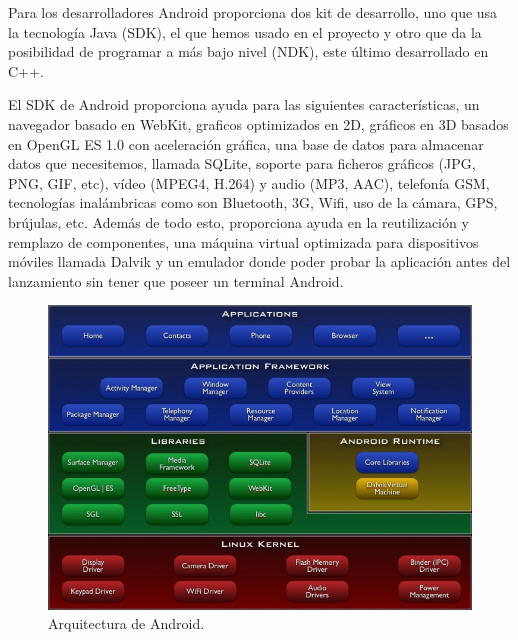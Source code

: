 Para los desarrolladores Android proporciona dos kit de desarrollo, uno que usa la tecnología Java (SDK), el que hemos usado en el proyecto y otro que da la posibilidad de programar a más bajo nivel (NDK), este último desarrollado en C++.

El SDK de Android proporciona ayuda para las siguientes características, un navegador basado en WebKit, graficos optimizados en 2D, gráficos en 3D basados en OpenGL ES 1.0 con aceleración gráfica, una base de datos para almacenar datos que necesitemos, llamada SQLite, soporte para ficheros gráficos (JPG, PNG, GIF, etc), vídeo (MPEG4, H.264) y audio (MP3, AAC), telefonía GSM, tecnologías inalámbricas como son Bluetooth, 3G, Wifi, uso de la cámara, GPS, brújulas, etc. Además de todo esto, proporciona ayuda en la reutilización y remplazo de componentes, una máquina virtual optimizada para dispositivos móviles llamada Dalvik y un emulador donde poder probar la aplicación antes del lanzamiento sin tener que poseer un terminal Android. 

\begin{figure}
  \centering
    \includegraphics[scale=0.6]{./Android/imagenes/arquitecturaAndroid.jpg}
  \caption{Arquitectura de Android.}
  \label{fig:arquitecturaAndroid}
\end{figure} 

